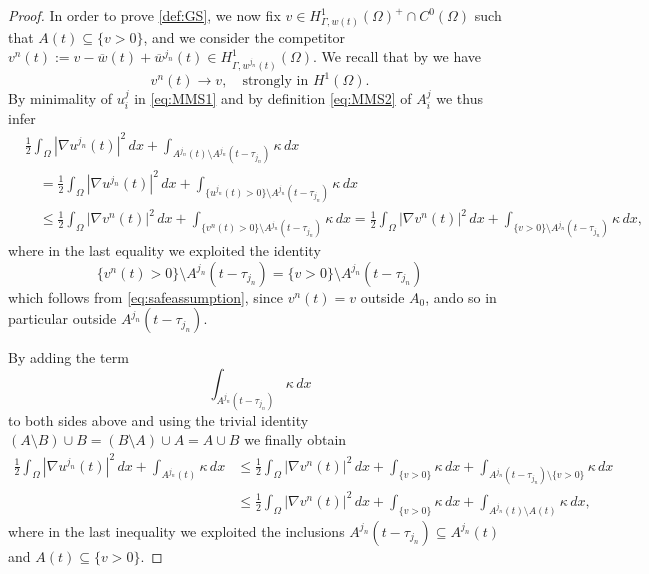 \documentclass[a4paper,11pt,reqno]{amsart}
\numberwithin{equation}{section}
\theoremstyle{definition}
\theoremstyle{remark}
\begin{document}
\begin{proof}
In order to prove \ref{def:GS}, we now fix $v\in H^1_{\Gamma,w(t)}(\Omega)^+\cap C^0(\Omega)$ such that $A(t)\subseteq \{v>0\}$, and we consider the competitor $v^n(t):=v-\overline w(t)+\overline w^{j_n}(t)\in H^1_{\Gamma,w^{j_n}(t)}(\Omega)$. We recall that by  we have
\begin{equation}\label{eq:strongconv}
    v^n(t)\to v,\quad \text{strongly in }H^1(\Omega).
\end{equation}
By minimality of $u^j_i$ in \eqref{eq:MMS1} and by definition \eqref{eq:MMS2} of $A^j_i$ we thus infer
\begin{align}
    & \frac 12 \int_\Omega |\nabla u^{j_n}(t)|^2 \, dx+\int_{A^{j_n}(t)\setminus A^{j_n}(t-\tau_{j_n})} \kappa \, dx\\
    &\quad = \frac 12 \int_\Omega |\nabla u^{j_n}(t)|^2 \, dx+\int_{\{u^{j_n}(t)>0\}\setminus A^{j_n}(t-\tau_{j_n})} \kappa \, dx\\
    &\quad \le \frac 12 \int_\Omega |\nabla v^{n}(t)|^2 \, dx+\int_{\{v^{n}(t)>0\}\setminus A^{j_n}(t-\tau_{j_n})} \kappa \, dx= \frac 12 \int_\Omega |\nabla v^{n}(t)|^2 \, dx+\int_{\{v>0\}\setminus A^{j_n}(t-\tau_{j_n})} \kappa \, dx,
\end{align}
where in the last equality we exploited the identity
\begin{equation}
    \{v^{n}(t)>0\}\setminus A^{j_n}(t-\tau_{j_n})=\{v>0\}\setminus A^{j_n}(t-\tau_{j_n})
\end{equation}
which follows from \eqref{eq:safeassumption}, since $v^n(t)=v$ outside $A_0$, ando so in particular outside $A^{j_n}(t-\tau_{j_n})$.

By adding the term
\begin{equation}
    \int_{A^{j_n}(t-\tau_{j_n})} \kappa \,d x
\end{equation}
to both sides above and using the trivial identity $(A\setminus B)\cup B= (B\setminus A)\cup A=A\cup B$ we finally obtain
\begin{align}
     \frac 12 \int_\Omega |\nabla u^{j_n}(t)|^2 \, dx+\int_{A^{j_n}(t)} \kappa \, dx&\le \frac 12 \int_\Omega |\nabla v^{n}(t)|^2 \, dx+\int_{\{v>0\}} \kappa \, dx+ \int_{ A^{j_n}(t-\tau_{j_n})\setminus\{v>0\}} \kappa \, dx\\
     &\le \frac 12 \int_\Omega |\nabla v^{n}(t)|^2 \, dx+\int_{\{v>0\}} \kappa \, dx+ \int_{ A^{j_n}(t)\setminus A(t)} \kappa \, dx,
\end{align}
where in the last inequality we exploited the inclusions $ A^{j_n}(t-\tau_{j_n})\subseteq  A^{j_n}(t)$ and $A(t)\subseteq \{v>0\}$.


\end{proof}
\end{document}
